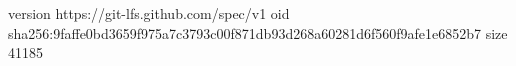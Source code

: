 version https://git-lfs.github.com/spec/v1
oid sha256:9faffe0bd3659f975a7c3793c00f871db93d268a60281d6f560f9afe1e6852b7
size 41185
